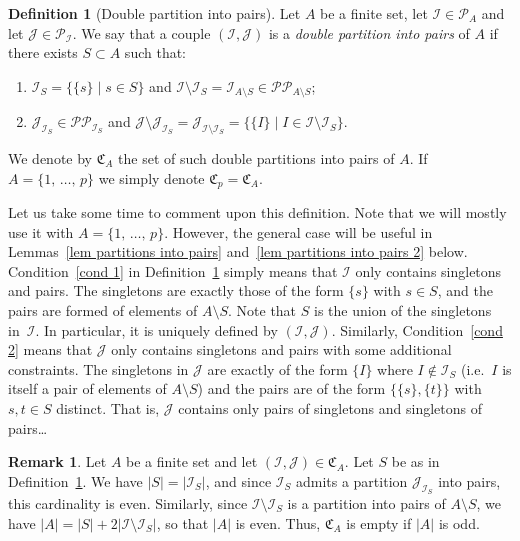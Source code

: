 \documentclass[10pt]{amsart}
\theoremstyle{definition}\newtheorem{defi}[theo]{Definition}\newtheorem{rema}[theo]{Remark}\newtheorem{exam}[theo]{Example}\newtheorem{exem}[theo]{Example}\newtheorem{nota}[theo]{Notation}
\newcommand{\I}{\mathcal{I}}
\newcommand{\J}{\mathcal{J}}
\newcommand{\frkC}{\mathfrak{C}}
\newcommand{\pa}{\mathcal{P}\!}
\newcommand{\pp}{\mathcal{P\!P}\!}
\begin{document}
\begin{defi}[Double partition into pairs]\label{def CA}
Let $A$ be a finite set, let $\I \in \pa_A$ and let $\J \in \pa_\I$. We say that a couple $(\I,\J)$ is a \emph{double partition into pairs} of $A$ if there exists $S \subset A$ such that:
\begin{enumerate}
\item \label{cond 1}
$\I_S = \{\{s\} \mid s \in S\}$ and $\I \setminus \I_S = \I_{A \setminus S} \in \pp_{A \setminus S}$;
\item \label{cond 2}
$\J_{\I_S} \in \pp_{\I_S}$ and $\J \setminus \J_{\I_S} = \J_{\I \setminus \I_S} = \{\{I\} \mid I \in \I \setminus \I_S\}$.
\end{enumerate}
We denote by $\frkC_A$ the set of such double partitions into pairs of $A$. If $A = \{1,\,\dots,\,p\}$ we simply denote $\frkC_p = \frkC_A$.
\end{defi}

Let us take some time to comment upon this definition. Note that we will mostly use it with $A = \{1,\,\dots,\,p\}$. However, the general case will be useful in Lemmas~\ref{lem partitions into pairs} and~\ref{lem partitions into pairs 2} below. Condition~\eqref{cond 1} in Definition~\ref{def CA} simply means that $\I$ only contains singletons and pairs. The singletons are exactly those of the form $\{s\}$ with $s \in S$, and the pairs are formed of elements of $A \setminus S$. Note that $S$ is the union of the singletons in~$\I$. In particular, it is uniquely defined by $(\I,\J)$. Similarly, Condition~\eqref{cond 2} means that $\J$ only contains singletons and pairs with some additional constraints. The singletons in $\J$ are exactly of the form $\{I\}$ where $I \notin \I_S$ (i.e.~$I$ is itself a pair of elements of $A \setminus S$) and the pairs are of the form $\{\{s\},\{t\}\}$ with $s,t \in S$ distinct. That is, $\J$ contains only pairs of singletons and singletons of pairs\dots

\begin{rema}\label{rem conditions 1 and 2}
Let $A$ be a finite set and let $(\I,\J) \in \frkC_A$. Let $S$ be as in Definition~\ref{def CA}. We have $|S| = |\I_S|$, and since $\I_S$ admits a partition $\J_{\I_S}$ into pairs, this cardinality is even. Similarly, since $\I \setminus \I_S$ is a partition into pairs of $A \setminus S$, we have $|A| = |S| + 2|\I \setminus \I_S|$, so that $|A|$ is even. Thus, $\frkC_A$ is empty if $|A|$ is odd.
\end{rema}
\end{document}
